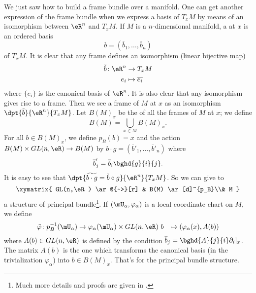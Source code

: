 			We just saw how to build a frame bundle over a manifold. One can get another expression of the frame bundle when we express a basis of $T_xM$ by means of an isomorphism between $\eR^n$ and $T_xM$. If $M$ is a $n$-dimensional manifold, a  at $x$ is an ordered basis
	\[
b=(\overline{ b }_1,\ldots,\overline{ b }_n)
	\]
of $T_xM$. It is clear that any frame defines an isomorphism (linear bijective map)
	\begin{equation}
	\begin{aligned}
	\tilde{b}\colon\eR^n & \to T_xM                 \\
		e_i                  & \mapsto \overline{ e_i }
		\end{aligned}
		\end{equation}
		where $\{e_i\}$ is the canonical basis of $\eR^n$. It is also clear that any isomorphism gives rise to a frame. Then we see a frame of $M$ at $x$ as an isomorphism $\dpt{\tilde{b}}{\eR^n}{T_xM}$. Let $B(M)_x$ be the of all the frames of $M$ at $x$; we define
		\[
			B(M)=\bigcup_{x\in M}B(M)_x.
			\]
			For all $b\in B(M)_x$, we define $p_B(b)=x$ and the action $B(M)\times GL(n,\eR)\to B(M)$ by $b\cdot g=(\overline{ b }'_1,\ldots,\overline{ b }'_n)$ where
			\begin{equation}
			\overline{ b }'_j=\overline{ b }_i\bghd{g}{i}{j}.
			\end{equation}
			It is easy to see that $\dpt{\widetilde{b\cdot g}=\tilde{b}\circ g}{\eR^n}{T_xM}$. So we can give to
			\begin{equation}
			\xymatrix{
				GL(n,\eR)  \ar@{~>}[r] & B(M) \ar[d]^{p_B}\\& M
			}
\end{equation}
a structure of principal bundle\footnote{Much more details and proofs are given in \cite{Naber}.}. If $(\mU_{\alpha},\varphi_{\alpha})$ is a local coordinate chart on $M$, we define
\begin{equation}
\begin{aligned}
\tilde{\varphi} \colon p_B^{-1}(\mU_{\alpha}) & \to \varphi_{\alpha}(\mU_{\alpha})\times GL(n,\eR)\
		b                                             & \mapsto (\varphi_{\alpha}(x),A(b))
		\end{aligned}
		\end{equation}
		where $A(b)\in GL(n,\eR)$ is defined by the condition $\overline{ b }_j=\bghd{A}{j}{i}\partial_i|_x$. The matrix $A(b)$ is the one which transforms the canonical basis (in the trivialization $\varphi_{\alpha}$) into $b\in B(M)_x$. That's for the principal bundle structure.

